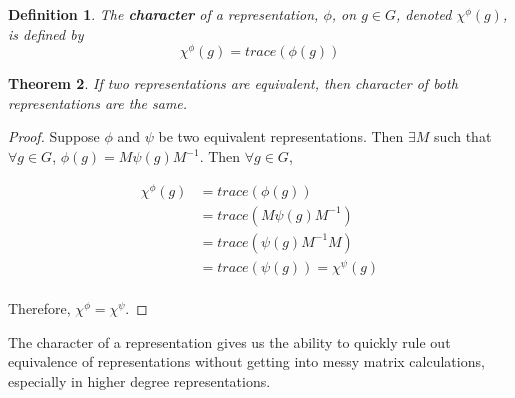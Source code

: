 \documentclass[10pt]{ucthesis}
\newtheorem{definition}{Definition}[chapter]
\newtheorem{theorem}[definition]{Theorem}
\begin{document}
\begin{definition}
	The \textbf{character} of a representation, $\phi$, on $g \in G$, denoted $\chi^{\phi}(g)$, is defined by $$\chi^{\phi}(g)=trace(\phi(g))$$
\end{definition}

\begin{theorem}
	If two representations are equivalent, then character of both representations are the same.
\end{theorem}

\begin{proof}Suppose $\phi$ and $\psi$ be two equivalent representations. Then $\exists M$ such that $\forall g \in G$, $\phi(g) = M\psi(g)M^{-1}$. Then $\forall g \in G$,

\begin{equation}
	\begin{aligned}
		\chi^{\phi}(g) &= trace(\phi(g)) \\
						&= trace(M\psi(g)M^{-1}) \\
						&= trace(\psi(g)M^{-1}M) \\
						&= trace(\psi(g)) = \chi^{\psi}(g) \\
	\end{aligned}
\end{equation}

Therefore, $\chi^{\phi} = \chi^{\psi}$. \end{proof}

The character of a representation gives us the ability to quickly rule out equivalence of representations without getting into messy matrix calculations, especially in higher degree representations.
\end{document}

